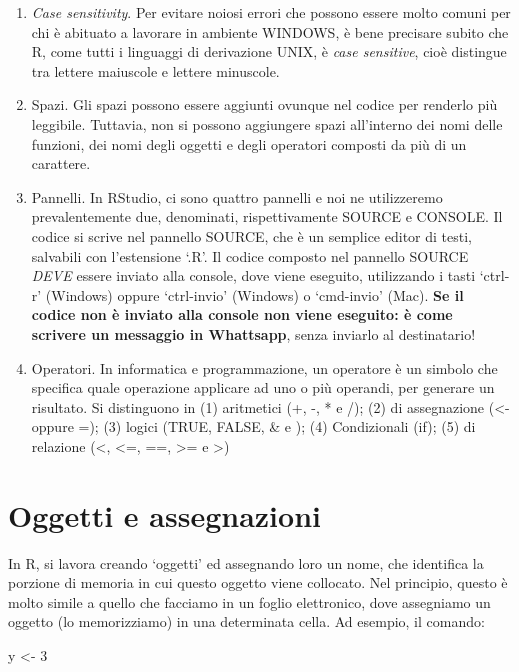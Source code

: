 \documentclass[
  12pt,
]{book}
\newenvironment{Shaded}{\begin{snugshade}}{\end{snugshade}}
\newcommand{\DecValTok}[1]{\textcolor[rgb]{0.00,0.00,0.81}{#1}}
\newcommand{\NormalTok}[1]{#1}
\newcommand{\OtherTok}[1]{\textcolor[rgb]{0.56,0.35,0.01}{#1}}
\providecommand{\tightlist}{%
  \setlength{\itemsep}{0pt}\setlength{\parskip}{0pt}}
\begin{document}
\begin{enumerate}
\def\labelenumi{\arabic{enumi}.}
\tightlist
\item
  \emph{Case sensitivity}. Per evitare noiosi errori che possono essere molto comuni per chi è abituato a lavorare in ambiente WINDOWS, è bene precisare subito che R, come tutti i linguaggi di derivazione UNIX, è \emph{case sensitive}, cioè distingue tra lettere maiuscole e lettere minuscole.
\item
  Spazi. Gli spazi possono essere aggiunti ovunque nel codice per renderlo più leggibile. Tuttavia, non si possono aggiungere spazi all'interno dei nomi delle funzioni, dei nomi degli oggetti e degli operatori composti da più di un carattere.
\item
  Pannelli. In RStudio, ci sono quattro pannelli e noi ne utilizzeremo prevalentemente due, denominati, rispettivamente SOURCE e CONSOLE. Il codice si scrive nel pannello SOURCE, che è un semplice editor di testi, salvabili con l'estensione `.R'. Il codice composto nel pannello SOURCE \emph{DEVE} essere inviato alla console, dove viene eseguito, utilizzando i tasti `ctrl-r' (Windows) oppure `ctrl-invio' (Windows) o `cmd-invio' (Mac). \textbf{Se il codice non è inviato alla console non viene eseguito: è come scrivere un messaggio in Whattsapp}, senza inviarlo al destinatario!
\item
  Operatori. In informatica e programmazione, un operatore è un simbolo che specifica quale operazione applicare ad uno o più operandi, per generare un risultato. Si distinguono in (1) aritmetici (+, -, * e /); (2) di assegnazione (\textless- oppure =); (3) logici (TRUE, FALSE, \& e \textbar); (4) Condizionali (if); (5) di relazione (\textless, \textless=, ==, \textgreater= e \textgreater)
\end{enumerate}

\hypertarget{oggetti-e-assegnazioni}{%
\section{Oggetti e assegnazioni}\label{oggetti-e-assegnazioni}}

In R, si lavora creando `oggetti' ed assegnando loro un nome, che identifica la porzione di memoria in cui questo oggetto viene collocato. Nel principio, questo è molto simile a quello che facciamo in un foglio elettronico, dove assegniamo un oggetto (lo memorizziamo) in una determinata cella. Ad esempio, il comando:

\begin{Shaded}
\begin{Highlighting}[]
\NormalTok{y  }\OtherTok{\textless{}{-}}  \DecValTok{3}
\end{Highlighting}
\end{Shaded}
\end{document}

